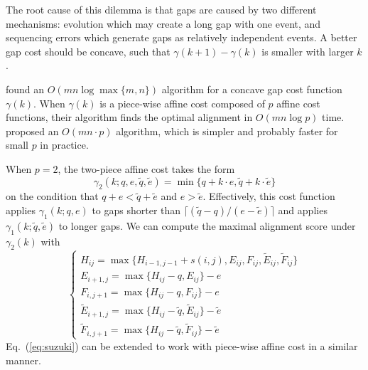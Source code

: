 \documentclass{bioinfo}
\begin{document}
\begin{methods}
The root cause of this dilemma is that gaps are caused by two different
mechanisms: evolution which may create a long gap with one event, and
sequencing errors which generate gaps as relatively independent events. A
better gap cost should be concave, such that $\gamma(k+1)-\gamma(k)$ is smaller
with larger $k$.

\citet{Miller:1988aa} found an $O(mn\log\max\{m,n\})$ algorithm for a concave
gap cost function $\gamma(k)$. When $\gamma(k)$ is a piece-wise affine cost
composed of $p$ affine cost functions, their algorithm finds the optimal
alignment in $O(mn\log p)$ time. \citet{Gotoh:1990aa} proposed an $O(mn\cdot
p)$ algorithm, which is simpler and probably faster for small $p$ in practice.

When $p=2$, the two-piece affine cost takes the form
\[
\gamma_2(k;q,e,\tilde{q},\tilde{e})=\min\{q+k\cdot e,\tilde{q}+k\cdot\tilde{e}\}
\]
on the condition that $q+e<\tilde{q}+\tilde{e}$ and $e>\tilde{e}$. Effectively,
this cost function applies $\gamma_1(k;q,e)$ to gaps shorter than
$\lceil(\tilde{q}-q)/(e-\tilde{e})\rceil$ and applies
$\gamma_1(k;\tilde{q},\tilde{e})$ to longer gaps. We can compute the maximal
alignment score under $\gamma_2(k)$ with
\begin{equation}\label{eq:affine2}
\left\{\begin{array}{l}
H_{ij} = \max\{H_{i-1,j-1}+s(i,j),E_{ij},F_{ij},\tilde{E}_{ij},\tilde{F}_{ij}\}\\
E_{i+1,j}= \max\{H_{ij}-q,E_{ij}\}-e\\
F_{i,j+1}= \max\{H_{ij}-q,F_{ij}\}-e\\
\tilde{E}_{i+1,j}= \max\{H_{ij}-\tilde{q},\tilde{E}_{ij}\}-\tilde{e}\\
\tilde{F}_{i,j+1}= \max\{H_{ij}-\tilde{q},\tilde{F}_{ij}\}-\tilde{e}
\end{array}\right.
\end{equation}
Eq.~(\ref{eq:suzuki}) can be extended to work with piece-wise affine cost in a
similar manner.

\end{methods}


\end{document}
